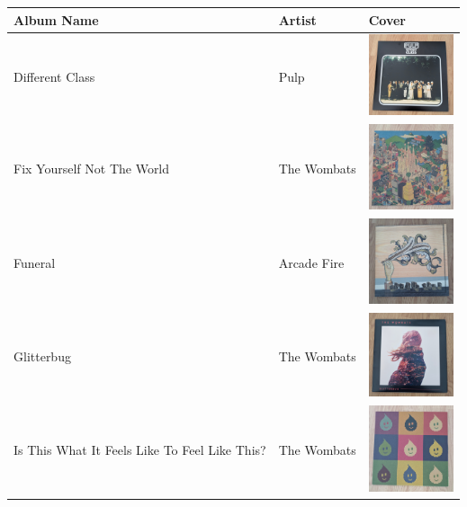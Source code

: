 \begin{table}[h]
    \centering
    \renewcommand{\arraystretch}{1.5} %
    \setlength{\tabcolsep}{10pt}      %
    \begin{tabular}{|m{4cm}|m{4cm}|m{4cm}|} %
        \hline
        \textbf{Album Name} & \textbf{Artist} & \textbf{Cover} \\
        \hline
        Different Class & Pulp & \includegraphics[width=2.5cm]{figures/test_albums/Different Class.jpg} \\
        \hline
        Fix Yourself Not The World & The Wombats & \includegraphics[width=2.5cm]{figures/test_albums/Fix yourself not the world.jpg} \\
        \hline
        Funeral & Arcade Fire & \includegraphics[width=2.5cm]{figures/test_albums/Funeral.jpg} \\
        \hline
        Glitterbug & The Wombats & \includegraphics[width=2.5cm]{figures/test_albums/Glitterbug.jpg} \\
        \hline
        Is This What It Feels Like To Feel Like This? & The Wombats & \includegraphics[width=2.5cm]{figures/test_albums/Is This What It Feels Like.jpg} \\

\end{tabular}
\end{table}
